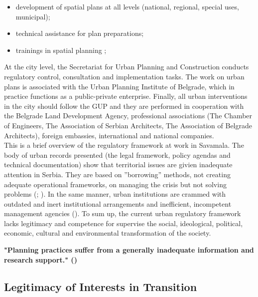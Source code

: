 \documentclass[11pt]{report}
\begin{document}
{{{{\begin{itemize}
\item development of spatial plans at all levels (national, regional, special uses, municipal);
\item technical assistance for plan preparations;
\item trainings in spatial planning ;
\end{itemize}

At the city level, the Secretariat for Urban Planning and Construction conducts regulatory control, consultation and implementation tasks. The work on urban plans is associated with the Urban Planning Institute of Belgrade, which in practice functions as a public-private enterprise. Finally, all urban interventions in the city should follow the GUP and they are performed in cooperation with the Belgrade Land Development Agency, professional associations (The Chamber of Engineers, The Association of Serbian Architects, The Association of Belgrade Architects), foreign embassies, international and national companies.
\\
This is a brief overview of the regulatory framework at work in Savamala.  The body of urban records presented (the legal framework, policy agendas and technical documentation) show that territorial issues are givien inadequate attention in Serbia. They are based on ”borrowing” methods, not creating adequate operational frameworks, on managing the crisis but not solving problems 
(\href{Nedovic}{\citealt{nedovic-budic_adjustment_2001}}; \href{Vujosevic}{\citealt{vujosevic_conundrum_2012}}).
In the same manner, urban institutions are crammed with outdated and inert institutional arrangements and inefficient, incompetent management agencies (\href{Vujosevic}{\citealt{vujosevic_conundrum_2012}}).
To sum up, the current urban regulatory framework lacks legitimacy and competence for supervise the social, ideological, political, economic, cultural and environmental transformation of the society.

\textbf{"Planning practices suffer from a generally inadequate information and research support." (\href{Vujosevic}{\citealt{vujosevic_novi_2012}})}

\subsection{Legitimacy of Interests in Transition}

}}}}
\end{document}
